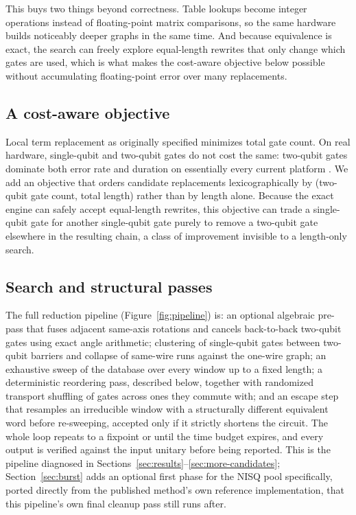 \documentclass[11pt]{article}
\begin{document}
This buys two things beyond correctness. Table lookups become integer
operations instead of floating-point matrix comparisons, so the same
hardware builds noticeably deeper graphs in the same time. And because
equivalence is exact, the search can freely explore equal-length rewrites
that only change which gates are used, which is what makes the cost-aware
objective below possible without accumulating floating-point error over
many replacements.

\subsection{A cost-aware objective}

Local term replacement as originally specified minimizes total gate
count. On real hardware, single-qubit and two-qubit gates do not cost the
same: two-qubit gates dominate both error rate and duration on essentially
every current platform \cite{Preskill2018NISQ,Cross2019QuantumVolume}. We
add an objective that orders candidate replacements lexicographically by
(two-qubit gate count, total length) rather than by length alone. Because
the exact engine can safely accept equal-length rewrites, this objective
can trade a single-qubit gate for another single-qubit gate purely to
remove a two-qubit gate elsewhere in the resulting chain, a class of
improvement invisible to a length-only search.

\subsection{Search and structural passes}

The full reduction pipeline (Figure~\ref{fig:pipeline}) is: an optional
algebraic pre-pass that fuses adjacent same-axis rotations and cancels
back-to-back two-qubit gates using exact angle arithmetic; clustering of
single-qubit gates between two-qubit barriers and collapse of same-wire
runs against the one-wire graph; an exhaustive sweep of the database over
every window up to a fixed length; a deterministic reordering pass,
described below, together with randomized transport shuffling of gates
across ones they commute with; and an escape step that resamples an
irreducible window with a structurally different equivalent word before
re-sweeping, accepted only if it strictly shortens the circuit. The whole
loop repeats to a fixpoint or until the time budget expires, and every
output is verified against the input unitary before being reported. This
is the pipeline diagnosed in Sections~\ref{sec:results}--\ref{sec:more-candidates};
Section~\ref{sec:burst} adds an optional first phase for the NISQ pool
specifically, ported directly from the published method's own reference
implementation, that this pipeline's own final cleanup pass still runs
after.
\end{document}
